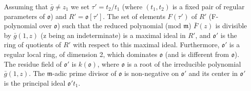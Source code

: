 Assuming that $\bar{g} \neq z_1$ we set $\tau' = t_2/t_1$ (where $(t_1, t_2)$ is a fixed pair of regular parameters of $\mathfrak{o}$) and $R' = \mathfrak{o}[\tau']$. The set of elements $F(\tau')$ of $R'$ (F-polynomial over $\mathfrak{o}$) such that the reduced polynomial (mod $\mathfrak{m}$) $\bar{F}(z)$ is divisible by $\bar{g}(1, z)$ (z being an indeterminate) is a maximal ideal in $R'$, and $\mathfrak{o}'$ is the ring of quotients of $R'$ with respect to this maximal ideal. Furthermore, $\mathfrak{o}'$ is a regular local ring, of dimension 2, which dominates $\mathfrak{o}$ (and is different from $\mathfrak{o}$). The residue field of $\mathfrak{o}'$ is $k(\mathfrak{o})$, where $\mathfrak{o}$ is a root of the irreducible polynomial $\bar{g}(1, z)$. The $\mathfrak{m}$-adic prime divisor of $\mathfrak{o}$ is non-negative on $\mathfrak{o}'$ and its center in $\mathfrak{o}'$ is the principal ideal $\mathfrak{o}'t_1$.